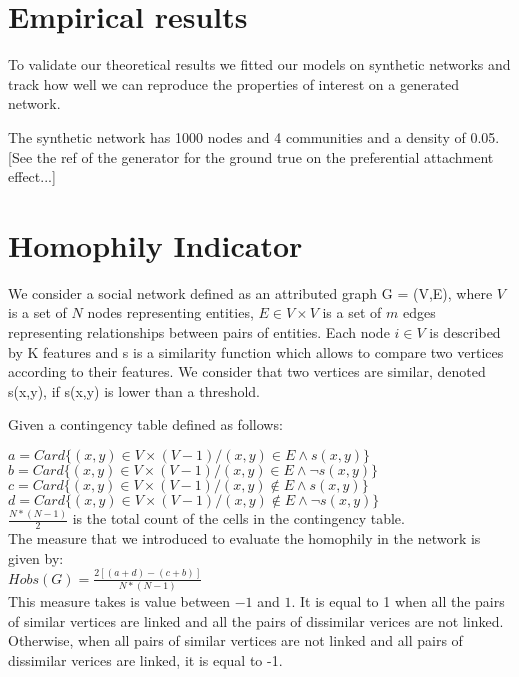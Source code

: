 \section{Empirical results}

To validate our theoretical results we fitted our models on synthetic networks and track how well we can reproduce the properties of interest on a generated network.

The synthetic network has 1000 nodes and 4 communities and a density of 0.05. [See the ref of the generator for the ground true on the preferential attachment effect...]

\section{Homophily Indicator}

We consider a social network defined as an attributed  graph G = (V,E), where $V$ is a set of $N$ nodes representing entities, $E \in V \times V$ is a set of $m$ edges  representing relationships between pairs of entities. Each node $i \in V$ is described by K features and s is a similarity function which allows to compare two vertices according to their features.  
We consider that two vertices are similar, denoted s(x,y), if s(x,y) is lower than a threshold.


Given a contingency table defined as follows:

$a = Card\{(x,y)\in V\times (V-1) / (x,y) \in E \land s(x,y)\}$\\
$b = Card\{(x,y)\in V\times (V-1) / (x,y) \in E \land \neg{s(x,y)}\}$\\
$c = Card\{(x,y)\in V\times (V-1) / (x,y) \notin E \land s(x,y)\}$\\
$d = Card\{(x,y)\in V\times (V-1) / (x,y) \notin E \land \neg{s(x,y)}\}$\\
$\frac{N*(N-1)}{2}$ is the total count of the cells in the contingency table.\\

The measure that we introduced to evaluate the homophily in the network is given by:\\

$Hobs(G) = \frac{2[(a+d)-(c+b)]}{N*(N-1)}$\\
This measure takes is value between $-1$ and $1$. It is equal to 1 when  all the pairs of similar vertices are linked and all the pairs of dissimilar verices are not linked.
Otherwise, when all pairs of similar vertices are not linked and all pairs of dissimilar verices are linked, it is equal to -1.

